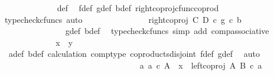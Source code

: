 \begin{isabellebody}
\ \ \ \ \ \ \ \ \ \ \ \ \isamarkupfalse%
\ {\isasymphi}{\isacharunderscore}{\kern0pt}def\ \isamarkupfalse%
\ f{\isacharunderscore}{\kern0pt}def\ g{\isacharunderscore}{\kern0pt}def\ b{\isacharprime}{\kern0pt}{\isacharunderscore}{\kern0pt}def\ right{\isacharunderscore}{\kern0pt}coproj{\isacharunderscore}{\kern0pt}cfunc{\isacharunderscore}{\kern0pt}coprod\ \isamarkupfalse%
\ {\isacharparenleft}{\kern0pt}typecheck{\isacharunderscore}{\kern0pt}cfuncs{\isacharcomma}{\kern0pt}\ auto{\isacharparenright}{\kern0pt}\isanewline
\ \ \ \ \ \ \ \ \ \ \isamarkupfalse%
\ \isamarkupfalse%
\ {\isachardoublequoteopen}{\isachardot}{\kern0pt}{\isachardot}{\kern0pt}{\isachardot}{\kern0pt}\ {\isacharequal}{\kern0pt}\ right{\isacharunderscore}{\kern0pt}coproj\ C\ D\ {\isasymcirc}\isactrlsub c\ {\isacharparenleft}{\kern0pt}g\ {\isasymcirc}\isactrlsub c\ b{\isacharprime}{\kern0pt}{\isacharparenright}{\kern0pt}{\isachardoublequoteclose}\isanewline
\ \ \ \ \ \ \ \ \ \ \ \ \ \ \isamarkupfalse%
\ g{\isacharunderscore}{\kern0pt}def\ b{\isacharprime}{\kern0pt}{\isacharunderscore}{\kern0pt}def\ \isamarkupfalse%
\ {\isacharparenleft}{\kern0pt}typecheck{\isacharunderscore}{\kern0pt}cfuncs{\isacharcomma}{\kern0pt}\ simp\ add{\isacharcolon}{\kern0pt}\ comp{\isacharunderscore}{\kern0pt}associative{}{\isacharparenright}{\kern0pt}\isanewline
\ \ \ \ \ \ \ \ \ \ \isamarkupfalse%
\ \isamarkupfalse%
\ {\isachardoublequoteopen}x\ {\isacharequal}{\kern0pt}\ y{\isachardoublequoteclose}\isanewline
\ \ \ \ \ \ \ \ \ \ \ \ \ \isamarkupfalse%
\ \ a{\isacharunderscore}{\kern0pt}def{\isacharparenleft}{\kern0pt}{}{\isacharparenright}{\kern0pt}\ b{\isacharprime}{\kern0pt}{\isacharunderscore}{\kern0pt}def{\isacharparenleft}{\kern0pt}{}{\isacharparenright}{\kern0pt}\ calculation\ comp{\isacharunderscore}{\kern0pt}type\ coproducts{\isacharunderscore}{\kern0pt}disjoint\ f{\isacharunderscore}{\kern0pt}def{\isacharparenleft}{\kern0pt}{}{\isacharparenright}{\kern0pt}\ g{\isacharunderscore}{\kern0pt}def{\isacharparenleft}{\kern0pt}{}{\isacharparenright}{\kern0pt}\ \isamarkupfalse%
\ auto\isanewline
\ \ \ \ \ \ \ \ \ \isamarkupfalse%
\isanewline
\ \ \ \ \ \ \ \isamarkupfalse%
\isanewline
\ \ \ \ \ \isamarkupfalse%
\isanewline
\ \ \ \ \ \ \ \ \ \isamarkupfalse%
\ {\isachardoublequoteopen}{\isasymnexists}a{\isachardot}{\kern0pt}\ a\ {\isasymin}\isactrlsub c\ A\ {\isasymand}\ x\ {\isacharequal}{\kern0pt}\ left{\isacharunderscore}{\kern0pt}coproj\ A\ B\ {\isasymcirc}\isactrlsub c\ a{\isachardoublequoteclose}\isanewline

\end{isabellebody}
